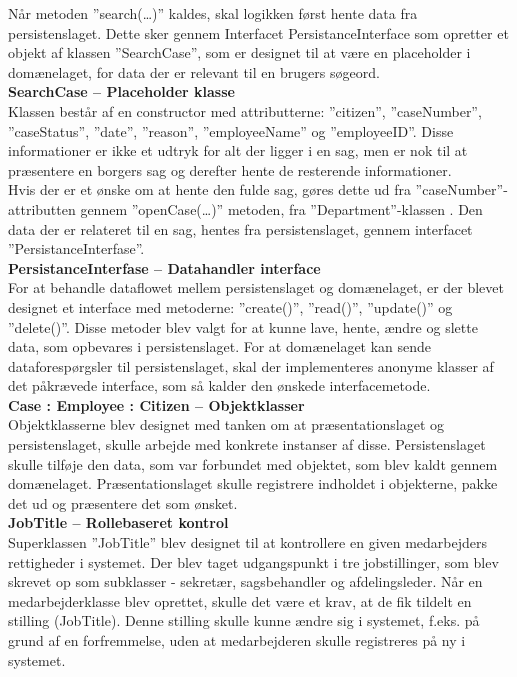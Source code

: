Når metoden ”search(…)” kaldes, skal logikken først hente data fra persistenslaget. Dette sker gennem Interfacet PersistanceInterface som opretter et objekt af klassen ”SearchCase”, som er designet til at være en placeholder i domænelaget, for data der er relevant til en brugers søgeord.\\
\textbf{SearchCase – Placeholder klasse}\\
Klassen består af en constructor med attributterne: ”citizen”, ”caseNumber”, ”caseStatus”, ”date”, ”reason”, ”employeeName” og ”employeeID”. Disse informationer er ikke et udtryk for alt der ligger i en sag, men er nok til at præsentere en borgers sag og derefter hente de resterende informationer. \\
Hvis der er et ønske om at hente den fulde sag, gøres dette ud fra ”caseNumber”-attributten gennem ”openCase(…)” metoden, fra ”Department”-klassen . Den data der er relateret til en sag, hentes fra persistenslaget, gennem interfacet ”PersistanceInterfase”.\\
\textbf{PersistanceInterfase – Datahandler interface}\\
For at behandle dataflowet mellem persistenslaget og domænelaget, er der blevet designet et interface med metoderne: ”create()”, ”read()”, ”update()” og ”delete()”. Disse metoder blev valgt for at kunne lave, hente, ændre og slette data, som opbevares i persistenslaget. For at domænelaget kan sende dataforespørgsler til persistenslaget, skal der implementeres anonyme klasser af det påkrævede interface, som så kalder den ønskede interfacemetode.\\ 
\textbf{Case : Employee : Citizen – Objektklasser}\\
Objektklasserne blev designet med tanken om at præsentationslaget og persistenslaget, skulle arbejde med konkrete instanser af disse. Persistenslaget skulle tilføje den data, som var forbundet med objektet, som blev kaldt gennem domænelaget. Præsentationslaget skulle registrere indholdet i objekterne, pakke det ud og præsentere det som ønsket. \\
\textbf{JobTitle – Rollebaseret kontrol}\\
Superklassen ”JobTitle” blev designet til at kontrollere en given medarbejders rettigheder i systemet. Der blev taget udgangspunkt i tre jobstillinger, som blev skrevet op som subklasser - sekretær, sagsbehandler og afdelingsleder. Når en medarbejderklasse blev oprettet, skulle det være et krav, at de fik tildelt en stilling (JobTitle). Denne stilling skulle kunne ændre sig i systemet, f.eks. på grund af en forfremmelse, uden at medarbejderen skulle registreres på ny i systemet.\\
